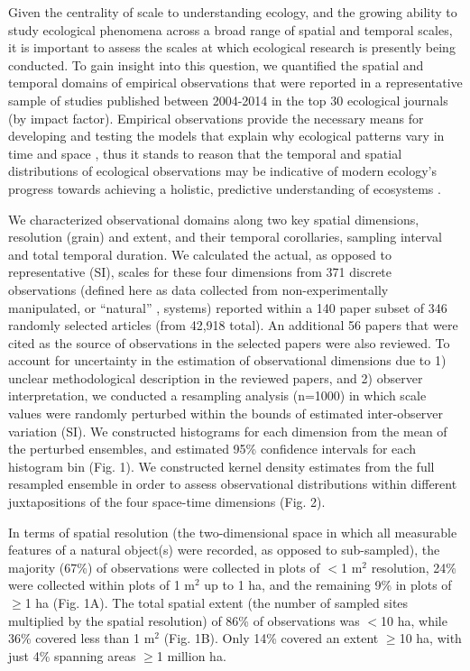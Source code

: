 \documentclass[12pt]{article}
\begin{document}
Given the centrality of scale to understanding ecology, and the growing ability to study ecological phenomena across a broad range of spatial and temporal scales, it is important to assess the scales at which ecological research is presently being conducted. To gain insight into this question, we quantified the spatial and temporal domains of empirical observations that were reported in a representative sample of studies published between 2004-2014 in the top 30 ecological journals (by impact factor). Empirical observations provide the necessary means for developing and testing the models that explain why ecological patterns vary in time and space \cite{levin_problem_1992, tilman_ecological_1989}, thus it stands to reason that the temporal and spatial distributions of ecological observations may be indicative of modern ecology's progress towards achieving a holistic, predictive understanding of ecosystems \cite{chave_problem_2013,levin_problem_1992}. 

We characterized observational domains along two key spatial dimensions, resolution (grain) and extent, and their temporal corollaries, sampling interval and total temporal duration. We calculated the actual, as opposed to representative (SI), scales for these four dimensions from 371 discrete observations (defined here as data collected from non-experimentally manipulated, or ``natural'' \cite{tilman_ecological_1989}, systems) reported within a 140 paper subset of 346 randomly selected articles (from 42,918 total). An additional 56 papers that were cited as the source of observations in the selected papers were also reviewed. To account for uncertainty in the estimation of observational dimensions due to 1) unclear methodological description in the reviewed papers, and 2) observer interpretation, we conducted a resampling analysis (n=1000) in which scale values were randomly perturbed within the bounds of estimated inter-observer variation (SI). We constructed histograms for each dimension from the mean of the perturbed ensembles, and estimated 95\% confidence intervals for each histogram bin (Fig. 1). We constructed  kernel density estimates from the full resampled ensemble in order to assess observational distributions within different juxtapositions of the four space-time dimensions (Fig. 2). 

In terms of spatial resolution (the two-dimensional space in which all measurable features of a natural object(s) were recorded, as opposed to sub-sampled), the majority (67\%) of observations were collected in plots of $<$1 m$^2$ resolution, 24\% were collected within plots of 1 m$^2$ up to 1 ha, and the remaining 9\% in plots of $\geq$1 ha (Fig. 1A). The total spatial extent (the number of sampled sites multiplied by the spatial resolution) of 86\% of observations was $<$10 ha, while 36\% covered less than 1 m$^2$ (Fig. 1B). Only 14\% covered an extent $\geq$10 ha, with just 4\% spanning areas $\geq$1 million ha. 
\end{document}
